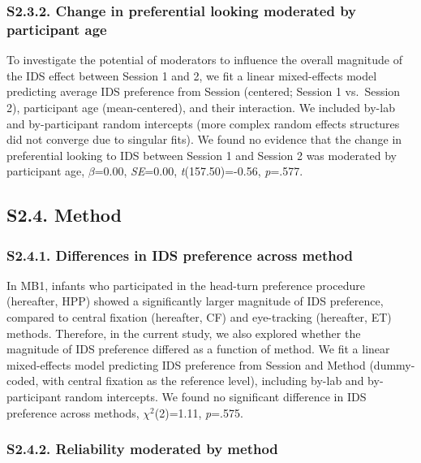 \documentclass[
  english,
  man, donotrepeattitle,floatsintext]{apa6}
\begin{document}
\hypertarget{s2.3.2.-change-in-preferential-looking-moderated-by-participant-age}{%
\subsubsection{S2.3.2. Change in preferential looking moderated by participant age}\label{s2.3.2.-change-in-preferential-looking-moderated-by-participant-age}}

To investigate the potential of moderators to influence the overall magnitude of the IDS effect between Session 1 and 2, we fit a linear mixed-effects model predicting average IDS preference from Session (centered; Session 1 vs.~Session 2), participant age (mean-centered), and their interaction.
We included by-lab and by-participant random intercepts (more complex random effects structures did not converge due to singular fits).
We found no evidence that the change in preferential looking to IDS between Session 1 and Session 2 was moderated by participant age, \(\beta\)=0.00, \emph{SE}=0.00, \emph{t}(157.50)=-0.56, \emph{p}=.577.

\hypertarget{s2.4.-method}{%
\subsection{S2.4. Method}\label{s2.4.-method}}

\hypertarget{s2.4.1.-differences-in-ids-preference-across-method}{%
\subsubsection{S2.4.1. Differences in IDS preference across method}\label{s2.4.1.-differences-in-ids-preference-across-method}}

In MB1, infants who participated in the head-turn preference procedure (hereafter, HPP) showed a significantly larger magnitude of IDS preference, compared to central fixation (hereafter, CF) and eye-tracking (hereafter, ET) methods. Therefore, in the current study, we also explored whether the magnitude of IDS preference differed as a function of method. We fit a linear mixed-effects model predicting IDS preference from Session and Method (dummy-coded, with central fixation as the reference level), including by-lab and by-participant random intercepts. We found no significant difference in IDS preference across methods, \({\chi}^2\)(2)=1.11, \emph{p}=.575.

\hypertarget{s2.4.2.-reliability-moderated-by-method}{%
\subsubsection{S2.4.2. Reliability moderated by method}\label{s2.4.2.-reliability-moderated-by-method}}
\end{document}
